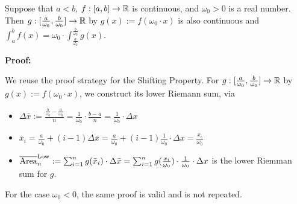 \Qed
\bigskip


\begin{tcolorbox}[title=\textcolor{black}{Proof of Prop.~\ref{thm:IntegralScalingProperty} (Scaling Property)}, sharp corners, colback=green!30, colframe=green!80!blue, breakable, fonttitle=\bfseries]

Suppose that $a < b$, $f:[a, b] \to \mathbb R$ is continuous, and $\omega_0 >0$ is a real number.  Then $g:[\frac{a}{\omega_0}, \frac{b}{\omega_0}] \to \mathbb R$ by $g(x):=f(\omega_0 \cdot x)$ is also continuous and
$\int_a^b f(x) = \omega_0 \cdot \int_{\frac{a}{\omega_0}}^{\frac{b}{\omega_0}} g(x)$. 

\end{tcolorbox}

\bigskip
\textbf{Proof:}

We reuse the proof strategy for the Shifting Property. For $g:[\frac{a}{\omega_0}, \frac{b}{\omega_0}]\to \mathbb R$ by $g(x):=f(\omega_0 \cdot x)$, we construct its lower Riemann sum, via
\begin{itemize}
    \item $\Delta \bar{x} := \frac{\frac{b}{\omega_0}-\frac{a}{\omega_0}}{n} = \frac{1}{\omega_0} \cdot \frac{b-a}{n} = \frac{1}{\omega_0} \cdot\Delta x$
    \item $\bar{x}_i = \frac{a}{\omega_0} + (i-1) \Delta \bar{x} = \frac{a}{\omega_0} + (i-1) \frac{1}{\omega_0} \cdot\Delta x = \frac{x_i}{\omega_0}$
      \item $ \overline{{\rm Area}}^{\rm Low}_n : = \sum_{i=1}^n g(\bar{x}_i) \cdot \Delta \bar{x} = \sum_{i=1}^n g(\frac{x_i}{\omega_0}) \cdot \frac{1}{\omega_0} \cdot\Delta x$ is the lower Riemman sum for $g$.
\end{itemize}


For the case $\omega_0 < 0$, the same proof is valid and is not repeated. 
\Qed



\bigskip

